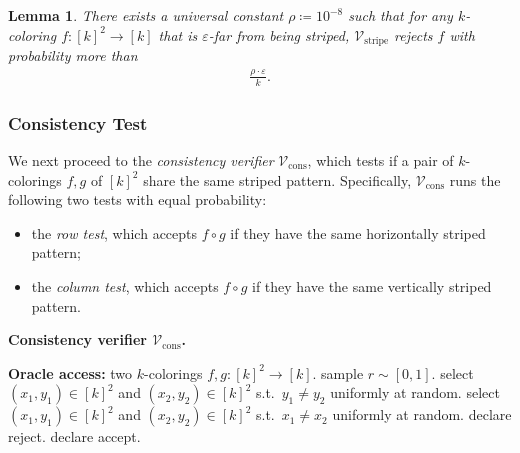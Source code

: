 \documentclass[11pt,fleqn]{article}
\renewcommand{\leq}{\leqslant}
\renewcommand{\epsilon}{\varepsilon}
\newcommand{\defeq}{\coloneq}
\newcommand{\V}{\calV}
\newcommand{\Accept}{\textsf{accept}\xspace}
\newcommand{\Reject}{\textsf{reject}\xspace}
\newcommand{\f}{f}
\newcommand{\g}{g}
\newcommand{\rhozero}{10^{-8}}
\newcommand{\Vstripe}{\V_\mathrm{stripe}}
\newcommand{\Vcons}{\V_\mathrm{cons}}
\newcommand{\calV}{\mathcal{V}}
\newtheorem{lemma}[theorem]{Lemma}
\theoremstyle{definition}
\numberwithin{equation}{section}
\begin{document}
\begin{lemma} \label{lem:Cut-hard:stripe:far}
    There exists a universal constant $\rho \defeq \rhozero$ such that
    for any $k$-coloring $\f \colon [k]^2 \to [k]$ that is $\epsilon$-far from being striped,
    $\Vstripe$ rejects $\f$ with probability more than
    \begin{align}
        \frac{\rho \cdot \epsilon}{k}.
    \end{align}
\end{lemma}


\subsubsection{Consistency Test}
\label{sec:Cut-hard:tests:cons}


We next proceed to the \emph{consistency verifier} $\Vcons$, which tests
if a pair of $k$-colorings $\f,\g$ of $[k]^2$ share the same striped pattern.
Specifically,
$\Vcons$ runs the following two tests with equal probability:
\begin{itemize}
    \item the \emph{row test},
    which accepts $\f \circ \g$ if
    they have the same horizontally striped pattern;
    \item the \emph{column test},
    which accepts $\f \circ \g$ if
    they have the same vertically striped pattern.
\end{itemize}


\begin{itembox}[l]{\textbf{Consistency verifier $\Vcons$.}}
\begin{algorithmic}[1]
    \item[\textbf{Oracle access:}]
        two $k$-colorings $\f, \g \colon [k]^2 \to [k]$.
    \State sample $r \sim [0,1]$.
    \If{$0 \leq r < \frac{1}{2}$} 
        \State select $(x_1,y_1) \in [k]^2$ and $(x_2,y_2) \in [k]^2$
            s.t.~$y_1 \neq y_2$ uniformly at random.
    \Else {}
        \State select $(x_1,y_1) \in [k]^2$ and $(x_2,y_2) \in [k]^2$
            s.t.~$x_1 \neq x_2$ uniformly at random.
    \EndIf
    \If{$\f(x_1,y_1) = \g(x_2,y_2)$}
        \State declare \Reject.
    \Else
        \State declare \Accept.
    \EndIf
\end{algorithmic}
\end{itembox}
\end{document}
